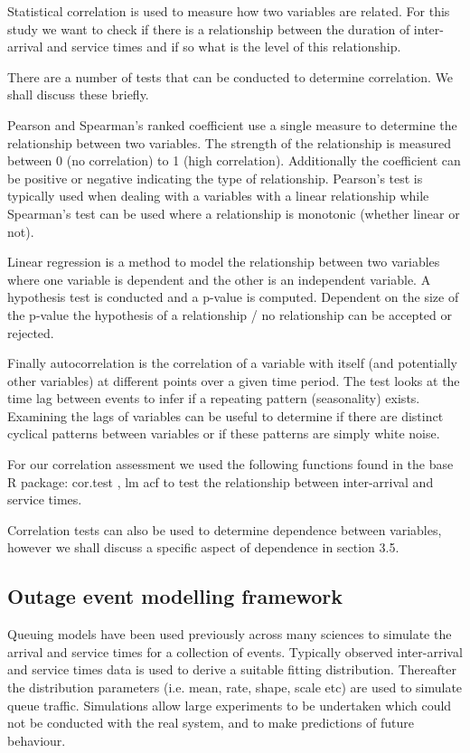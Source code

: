 \documentclass[5p]{elsarticle}
\begin{document}
Statistical correlation is used to measure how two variables are related. For this study we want to check if there is a relationship between the duration of inter-arrival and service times and if so what is the level of this relationship. 

There are a number of tests that can be conducted to determine correlation. We shall discuss these briefly.

Pearson \cite{fisher1915frequency} and Spearman's \cite{spearman1904proof} ranked coefficient use a single measure to determine the relationship between two variables. The strength of the relationship is measured between 0 (no correlation) to 1 (high correlation). Additionally the coefficient can be positive or negative indicating the type of relationship. Pearson's test is typically used when dealing with a variables with a linear relationship while Spearman's test can be used where a relationship is monotonic (whether linear or not). 

Linear regression \cite{galton1890kinship} is a method to model the relationship between two variables where one variable is dependent and the other is an  independent variable. A hypothesis test is conducted and a p-value is computed. Dependent on the size of the p-value the hypothesis of a relationship / no relationship can be accepted or rejected.

Finally autocorrelation \cite{box1970distribution} is the correlation of a variable with itself (and potentially other variables) at different points over a given time period. The test looks at the time lag between events to infer if a repeating pattern (seasonality) exists. Examining the lags of variables can be useful to determine if there are distinct cyclical patterns between variables or if these patterns are simply white noise.

For our correlation assessment we used the following functions found in the base R package: cor.test \cite{PearSpearR}, lm \cite{lmR} acf \cite{acfR} to test the relationship between inter-arrival and service times.

Correlation tests can also be used to determine dependence between variables, however we shall discuss a specific aspect of dependence in section 3.5. 

\subsection{Outage event modelling framework}

Queuing models have been used previously across many sciences to simulate the arrival and service times for a collection of events. Typically observed inter-arrival and service times data is used to derive a suitable fitting distribution. Thereafter the distribution parameters (i.e. mean, rate, shape, scale etc) are used to simulate queue traffic. Simulations allow large experiments to be undertaken which could not be conducted with the real system, and to make predictions of future behaviour.
\end{document}
